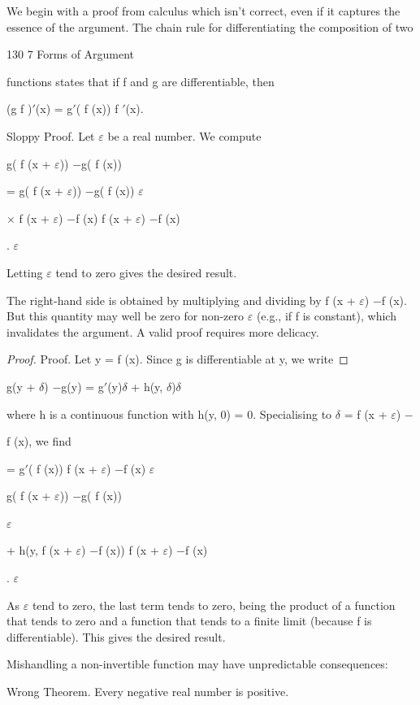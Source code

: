 \documentclass[11pt]{article}
\theoremstyle{plain}
\theoremstyle{definition}
\begin{document}
We begin with a proof from calculus which isn't correct, even if it captures the essence of the argument. The chain rule for differentiating the composition of two

130 7 Forms of Argument

functions states that if f and g are differentiable, then

(g f )$'$(x) = g$'$( f (x)) f $'$(x).

Sloppy Proof. Let $\varepsilon$ be a real number. We compute

g( f (x + $\varepsilon$)) $-$g( f (x))

= g( f (x + $\varepsilon$)) $-$g( f (x)) $\varepsilon$

$\times$ f (x + $\varepsilon$) $-$f (x) f (x + $\varepsilon$) $-$f (x)

. $\varepsilon$

Letting $\varepsilon$ tend to zero gives the desired result. 

The right-hand side is obtained by multiplying and dividing by f (x + $\varepsilon$) $-$f (x). But this quantity may well be zero for non-zero $\varepsilon$ (e.g., if f is constant), which invalidates the argument. A valid proof requires more delicacy.

\begin{proof}
Proof. Let y = f (x). Since g is differentiable at y, we write
\end{proof}

g(y + $\delta$) $-$g(y) = g$'$(y)$\delta$ + h(y, $\delta$)$\delta$

where h is a continuous function with h(y, 0) = 0. Specialising to $\delta$ = f (x + $\varepsilon$) $-$

f (x), we find

= g$'$( f (x)) f (x + $\varepsilon$) $-$f (x) $\varepsilon$

g( f (x + $\varepsilon$)) $-$g( f (x))

$\varepsilon$

+ h(y, f (x + $\varepsilon$) $-$f (x)) f (x + $\varepsilon$) $-$f (x)

. $\varepsilon$

As $\varepsilon$ tend to zero, the last term tends to zero, being the product of a function that tends to zero and a function that tends to a finite limit (because f is differentiable). This gives the desired result. 

Mishandling a non-invertible function may have unpredictable consequences:

Wrong Theorem. Every negative real number is positive.
\end{document}
